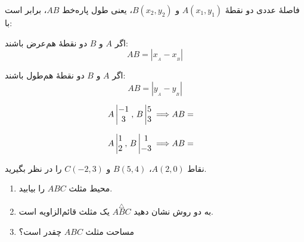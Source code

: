 
\begin{remark}[توجه]
فاصلۀ عددی دو نقطۀ
\(A(x_1,y_1)\) و \(B(x_2,y_2)\)،
یعنی طول پاره‌خط \(AB\)، برابر است با:

\begin{center}
\end{center}

\begin{minipage}[c]{0.48\textwidth}
    اگر \(A\) و \(B\) دو نقطۀ هم‌عرض باشند:
    \[
        AB=|x_{_A}-x_{_B}|
    \]
\end{minipage}
\hfill
\begin{minipage}[c]{0.43\textwidth}
    اگر \(A\) و \(B\) دو نقطۀ هم‌طول باشند:
    \[
        AB=|y_{_A}-y_{_B}|
    \]
\end{minipage}

\vspace{0.4\baselineskip}

\begin{minipage}[c]{0.48\textwidth}
    \[
    \begin{gathered}
        A\left|\begin{matrix}-1\\3\end{matrix}\right.,\, B\left|\begin{matrix}5\\3\end{matrix}\right.\,
        \Longrightarrow AB= \quad
    \end{gathered}
    \]
\end{minipage}
\hfill
\begin{minipage}[c]{0.43\textwidth}
    \[
    \begin{gathered}
        A\left|\begin{matrix}1\\2\end{matrix}\right.,\, B\left|\begin{matrix}1\\-3\end{matrix}\right.\,
        \Longrightarrow AB= \quad
    \end{gathered}
    \]
\end{minipage}
\end{remark}


\vspace{0.6\baselineskip}

\begin{example}
نقاط \(A(2,0)\)، \(B(5,4)\) و \(C(-2,3)\)
را در نظر بگیرید.

\begin{enumerate}
    \setlength{\itemsep}{0.8\baselineskip}

    \item محیط مثلث \(ABC\) را بیابید.

    \item به دو روش نشان دهید
    \(\overset{\triangle}{ABC}\)
    یک مثلث قائم‌الزاویه است.

    \item مساحت مثلث \(ABC\) چقدر است؟
\end{enumerate}
\end{example}

